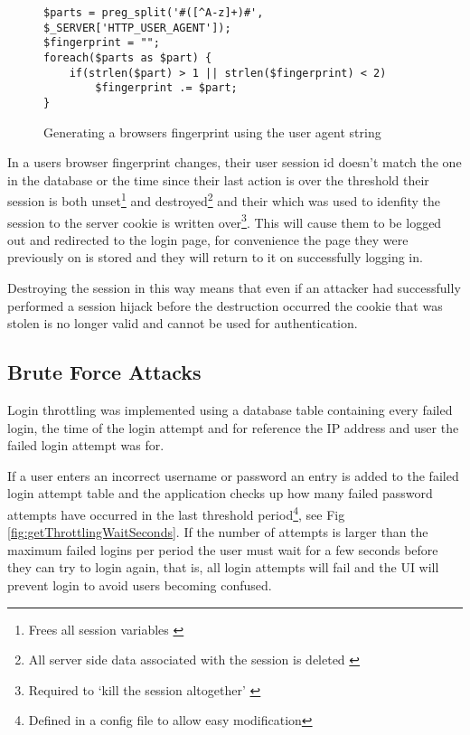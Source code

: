 \begin{figure}
\centering
\begin{lstlisting}[style=phpcolor]
$parts = preg_split('#([^A-z]+)#', $_SERVER['HTTP_USER_AGENT']);
$fingerprint = "";
foreach($parts as $part) {
	if(strlen($part) > 1 || strlen($fingerprint) < 2)
		$fingerprint .= $part;
}
\end{lstlisting}
\caption{Generating a browsers fingerprint using the user agent string}
\label{fig:fingerprinting}
\end{figure}

In a users browser fingerprint changes, their user session id doesn't match the one in the database or the time since their last action is over the threshold their session is both unset\footnote{Frees all session variables \parencite{php2014sessionunset}} and destroyed\footnote{All server side data associated with the session is deleted \parencite{php2014sessiondesroy}} and their which was used to idenfity the session to the server cookie is written over\footnote{Required to `kill the session altogether' \parencite{php2014sessiondesroy}}. This will cause them to be logged out and redirected to the login page, for convenience the page they were previously on is stored and they will return to it on successfully logging in.

Destroying the session in this way means that even if an attacker had successfully performed a session hijack before the destruction occurred the cookie that was stolen is no longer valid and cannot be used for authentication.

\subsection{Brute Force Attacks}

Login throttling was implemented using a database table containing every failed login, the time of the login attempt and for reference the IP address and user the failed login attempt was for.

If a user enters an incorrect username or password an entry is added to the failed login attempt table and the application checks up how many failed password attempts have occurred in the last threshold period\footnote{Defined in a config file to allow easy modification}, see Fig \ref{fig:getThrottlingWaitSeconds}.
%
If the number of attempts is larger than the maximum failed logins per period the user must wait for a few seconds before they can try to login again, that is, all login attempts will fail and the UI will prevent login to avoid users becoming confused.

